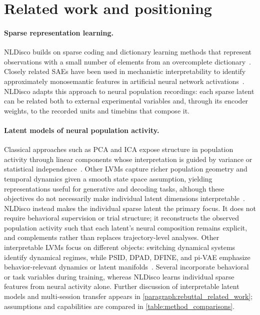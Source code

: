 \section{Related work and positioning}
\label{section:related_work}

\paragraph{Sparse representation learning.}
NLDisco builds on sparse coding and dictionary learning methods that represent observations with a small number of elements from an overcomplete dictionary~\citep{olshausen_1997_sparse_overcomplete, hoyer_2004_sparsenmf}. Closely related SAEs have been used in mechanistic interpretability to identify approximately monosemantic features in artificial neural network activations~\citep{cunningham_2023_saes, bricken_2023_towards_monosemanticity, templeton_2024_scaling_monosemanticity, dunefsky_2024_transcoders, lindsey_2024_crosscoders, ameisen_2025_circuit_tracing}. NLDisco adapts this approach to neural population recordings: each sparse latent can be related both to external experimental variables and, through its encoder weights, to the recorded units and timebins that compose it.

\paragraph{Latent models of neural population activity.}
Classical approaches such as PCA and ICA expose structure in population activity through linear components whose interpretation is guided by variance or statistical independence~\citep{hotelling_1933_pca, comon_1994_ica}. Other LVMs capture richer population geometry and temporal dynamics given a smooth state space assumption, yielding representations useful for generative and decoding tasks, although these objectives do not necessarily make individual latent dimensions interpretable~\citep{yu_2009_gpfa, pandarinath_2018_lfads, keshtkaran_2022_autolfads, schneider_2023_cebra, song_2025_langevinflow}. NLDisco instead makes the individual sparse latent the primary focus. It does not require behavioral supervision or trial structure; it reconstructs the observed population activity such that each latent's neural composition remains explicit, and complements rather than replaces trajectory-level analyses. Other interpretable LVMs focus on different objects: switching dynamical systems identify dynamical regimes, while PSID, DPAD, DFINE, and pi-VAE emphasize behavior-relevant dynamics or latent manifolds~\citep{linderman_2017_rslds, sani_2021_psid, sani_2024_dpad, abbaspourazad_2024_dfine, zhou_2020_pivae}. Several incorporate behavioral or task variables during training, whereas NLDisco learns individual sparse features from neural activity alone. Further discussion of interpretable latent models and multi-session transfer appears in \hyperref[paragraph:rebuttal_related_work]{\ref*{paragraph:rebuttal_related_work}}; assumptions and capabilities are compared in \autoref{table:method_comparisons}.

